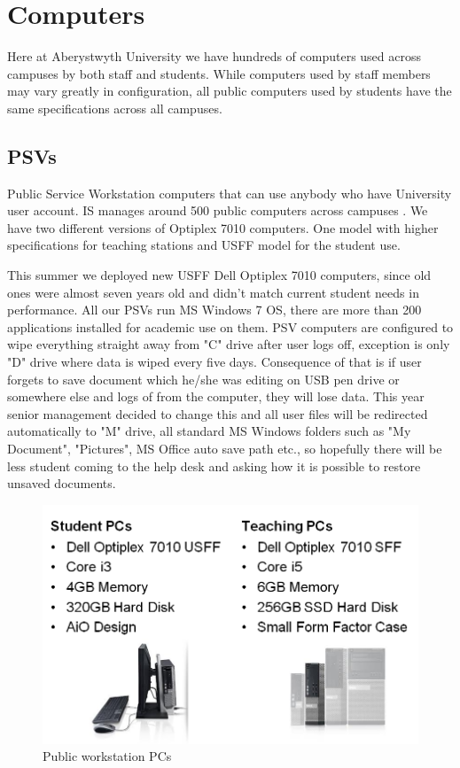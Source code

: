\documentclass[10pt,a4paper,headinclude=true]{report}
\begin{document}
\section{Computers}
Here at Aberystwyth University we have hundreds of computers used across campuses by both staff and students. While computers used by staff members may vary greatly in configuration, all public computers used by students have the same specifications across all campuses.
\subsection{PSVs}
Public Service Workstation computers that can use anybody who have University user account. IS manages around 500 public computers across campuses \cite{PSVs2}. We have two different versions of Optiplex 7010 computers. One model with higher specifications for teaching stations and USFF model for the student use. 

This summer we deployed new USFF Dell Optiplex 7010 \cite{PSVs} computers, since old ones were almost seven years old and didn't match current student needs in performance. All our PSVs run MS Windows 7 OS, there are more than 200 applications installed for academic use on them. PSV computers are configured to wipe everything straight away from "C" drive after user logs off, exception is only "D" drive where data is wiped every five days. Consequence of that is if user forgets to save document which he/she was editing on USB pen drive or somewhere else and logs of from the computer, they will lose data. This year senior management decided to change this and all user files will be redirected automatically to "M" drive, all standard MS Windows folders such as "My Document", "Pictures", MS Office auto save path etc., so hopefully there will be less student coming to the help desk and asking how it is possible to restore unsaved documents.
\begin{figure}[H]
\centering
\centerline{\includegraphics[scale=0.5]{./PSVs}}
\caption{Public workstation PCs \cite{PSVs}}
\label{fig:PSVs}
\end{figure}
\end{document}
